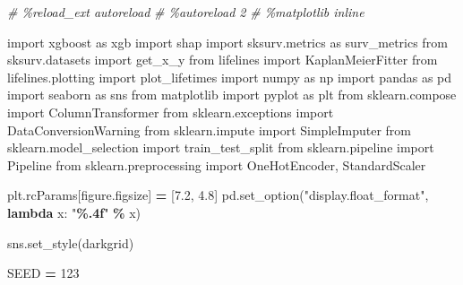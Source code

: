 \documentclass[
]{book}
\newenvironment{Shaded}{\begin{snugshade}}{\end{snugshade}}
\newcommand{\CommentTok}[1]{\textcolor[rgb]{0.56,0.35,0.01}{\textit{#1}}}
\newcommand{\DecValTok}[1]{\textcolor[rgb]{0.00,0.00,0.81}{#1}}
\newcommand{\FloatTok}[1]{\textcolor[rgb]{0.00,0.00,0.81}{#1}}
\newcommand{\ImportTok}[1]{#1}
\newcommand{\KeywordTok}[1]{\textcolor[rgb]{0.13,0.29,0.53}{\textbf{#1}}}
\newcommand{\NormalTok}[1]{#1}
\newcommand{\OperatorTok}[1]{\textcolor[rgb]{0.81,0.36,0.00}{\textbf{#1}}}
\newcommand{\SpecialCharTok}[1]{\textcolor[rgb]{0.81,0.36,0.00}{\textbf{#1}}}
\newcommand{\StringTok}[1]{\textcolor[rgb]{0.31,0.60,0.02}{#1}}
\begin{document}
\begin{Shaded}
\begin{Highlighting}[]
\CommentTok{\# \%reload\_ext autoreload}
\CommentTok{\# \%autoreload 2}
\CommentTok{\# \%matplotlib inline}

\ImportTok{import}\NormalTok{ xgboost }\ImportTok{as}\NormalTok{ xgb}
\ImportTok{import}\NormalTok{ shap}
\ImportTok{import}\NormalTok{ sksurv.metrics }\ImportTok{as}\NormalTok{ surv\_metrics}
\ImportTok{from}\NormalTok{ sksurv.datasets }\ImportTok{import}\NormalTok{ get\_x\_y}
\ImportTok{from}\NormalTok{ lifelines }\ImportTok{import}\NormalTok{ KaplanMeierFitter}
\ImportTok{from}\NormalTok{ lifelines.plotting }\ImportTok{import}\NormalTok{ plot\_lifetimes}
\ImportTok{import}\NormalTok{ numpy }\ImportTok{as}\NormalTok{ np}
\ImportTok{import}\NormalTok{ pandas }\ImportTok{as}\NormalTok{ pd}
\ImportTok{import}\NormalTok{ seaborn }\ImportTok{as}\NormalTok{ sns}
\ImportTok{from}\NormalTok{ matplotlib }\ImportTok{import}\NormalTok{ pyplot }\ImportTok{as}\NormalTok{ plt}
\ImportTok{from}\NormalTok{ sklearn.compose }\ImportTok{import}\NormalTok{ ColumnTransformer}
\ImportTok{from}\NormalTok{ sklearn.exceptions }\ImportTok{import}\NormalTok{ DataConversionWarning}
\ImportTok{from}\NormalTok{ sklearn.impute }\ImportTok{import}\NormalTok{ SimpleImputer}
\ImportTok{from}\NormalTok{ sklearn.model\_selection }\ImportTok{import}\NormalTok{ train\_test\_split}
\ImportTok{from}\NormalTok{ sklearn.pipeline }\ImportTok{import}\NormalTok{ Pipeline}
\ImportTok{from}\NormalTok{ sklearn.preprocessing }\ImportTok{import}\NormalTok{ OneHotEncoder, StandardScaler}



\NormalTok{plt.rcParams[}\StringTok{\textquotesingle{}figure.figsize\textquotesingle{}}\NormalTok{] }\OperatorTok{=}\NormalTok{ [}\FloatTok{7.2}\NormalTok{, }\FloatTok{4.8}\NormalTok{]}
\NormalTok{pd.set\_option(}\StringTok{"display.float\_format"}\NormalTok{, }\KeywordTok{lambda}\NormalTok{ x: }\StringTok{"}\SpecialCharTok{\%.4f}\StringTok{"} \OperatorTok{\%}\NormalTok{ x)}

\NormalTok{sns.set\_style(}\StringTok{\textquotesingle{}darkgrid\textquotesingle{}}\NormalTok{)}

\NormalTok{SEED }\OperatorTok{=} \DecValTok{123}
\end{Highlighting}
\end{Shaded}
\end{document}
